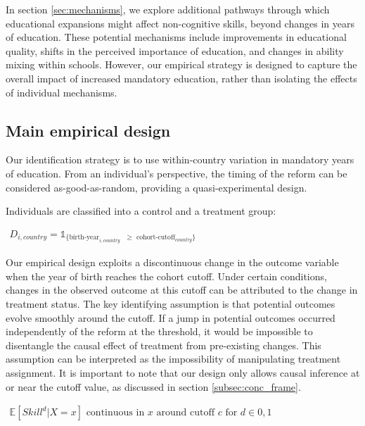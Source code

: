 In section \ref{sec:mechanisms}, we explore additional pathways through which educational expansions might affect non-cognitive skills, beyond changes in years of education. These potential mechanisms include improvements in educational quality, shifts in the perceived importance of education, and changes in ability mixing within schools. However, our empirical strategy is designed to capture the overall impact of increased mandatory education, rather than isolating the effects of individual mechanisms.



\subsection{Main empirical design} \label{subsec:emp_main}

Our identification strategy is to use within-country variation in mandatory years of education. From an individual's perspective, the timing of the reform can be considered as-good-as-random, providing a quasi-experimental design.

Individuals are classified into a control and a treatment group:

{\centering
	$ \displaystyle
	\begin{aligned}
		D_{i, country} = \mathds{1}_{\{\text{birth-year}_{i, country} \text{ } \geq \text{ cohort-cutoff}_{country}\}}
	\end{aligned}
	$
\par}%


Our empirical design exploits a discontinuous change in the outcome variable when the year of birth reaches the cohort cutoff. Under certain conditions, changes in the observed outcome at this cutoff can be attributed to the change in treatment status. The key identifying assumption is that potential outcomes evolve smoothly around the cutoff. If a jump in potential outcomes occurred independently of the reform at the threshold, it would be impossible to disentangle the causal effect of treatment from pre-existing changes. This assumption can be interpreted as the impossibility of manipulating treatment assignment. It is important to note that our design only allows causal inference at or near the cutoff value, as discussed in section \ref{subsec:conc_frame}.


{\centering
	$ \displaystyle
	\begin{aligned}
		\mathbb{E}[Skill^d|X=x] \text{ continuous in } x \text{ around cutoff } c \text{ for } d \in {0,1}
	\end{aligned}
	$
\par}%


